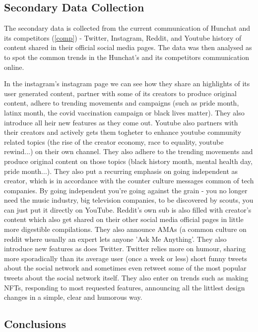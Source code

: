 \documentclass[12pt]{article}
\begin{document}
\subsection{Secondary Data Collection}
The secondary data is collected from the current communication of Hunchat and its competitors  (\ref{comp}) - Twitter, Instagram, Reddit, and Youtube history of content shared in their official social media pages. The data was then analysed as to spot the common trends in the Hunchat's and its competitors communication online. 

In the instagram's instagram page we can see how they share an highlights of its user generated content, partner with some of its creators to produce original content, adhere to trending movements and campaigns (such as pride month, latinx month, the covid vaccination campaign or black lives matter). They also introduce all heir new features as they come out. Youtube also partners with their creators and actively gets them togheter to enhance youtube community related topics (the rise of the creator economy, race to equality, youtube rewind...) on their own channel. They also adhere to the trending movements and produce original content on those topics (black history month, mental health day, pride month...). They also put a recurring emphasis on going independent as creator, which is in accordance with the counter culture messages common of tech companies. By going independent you're going against the grain - you no longer need the music industry, big television companies, to be discovered by scouts, you can just put it directly on YouTube. Reddit's own sub is also filled with creator's content which also get shared on their other social media official pages in little more digestible compilations. They also announce AMAs (a common culture on reddit where usually an expert lets anyone 'Ask Me Anything'. They also introduce new features as does Twitter. Twitter relies more on humour, sharing more sporadically than its average user (once a week or less) short funny tweets about the social network  and sometimes even retweet some of the most popular tweets about the social network itself. They also enter on trends such as making NFTs, responding to most requested features, announcing all the littlest design changes in a simple, clear and humorous way.


\subsection{Conclusions}\label{meth:conclusions}
\end{document}
